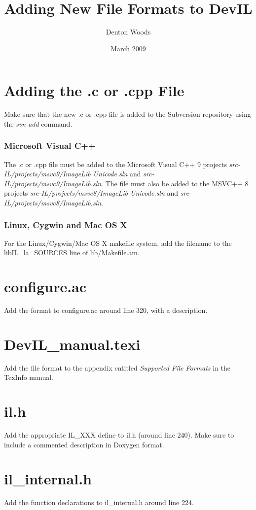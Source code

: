 \documentclass[letterpaper,10pt]{article}
\title{Adding New File Formats to DevIL}
\author{Denton Woods}
\date{March 2009}
\begin{document}
\maketitle

\section*{Adding the .c or .cpp File}
Make sure that the new .c or .cpp file is added to the Subversion repository using the \emph{svn add} command.

\subsubsection*{Microsoft Visual C++}
The .c or .cpp file must be added to the Microsoft Visual C++ 9 projects \emph{src-IL/projects/msvc9/ImageLib Unicode.sln} and \emph{src-IL/projects/msvc9/ImageLib.sln}.  The file must also be added to the MSVC++ 8 projects \emph{src-IL/projects/msvc8/ImageLib Unicode.sln} and \emph{src-IL/projects/msvc8/ImageLib.sln}.

\subsubsection*{Linux, Cygwin and Mac OS X}
For the Linux/Cygwin/Mac OS X makefile system, add the filename to the libIL\_la\_SOURCES line of lib/Makefile.am.


\section*{configure.ac}
Add the format to configure.ac around line 320, with a description.


\section*{DevIL_manual.texi}
Add the file format to the appendix entitled \emph{Supported File Formats} in the TexInfo manual.


\section*{il.h}
Add the appropriate IL\_XXX define to il.h (around line 240).  Make sure to include a commented description in Doxygen format.


\section*{il\_internal.h}
Add the function declarations to il\_internal.h around line 224.
\end{document}
